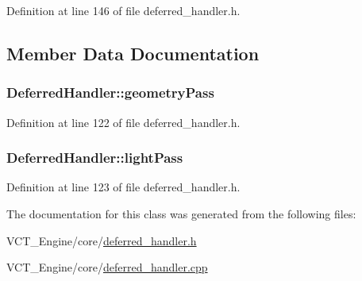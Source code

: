 Definition at line 146 of file deferred\+\_\+handler.\+h.



\subsection{Member Data Documentation}
\hypertarget{class_deferred_handler_ae4c429b5ccbb6c063cbf58e2339d386b}{}
\subsubsection[{geometry\+Pass}]{ Deferred\+Handler\+::geometry\+Pass}\label{class_deferred_handler_ae4c429b5ccbb6c063cbf58e2339d386b}


Definition at line 122 of file deferred\+\_\+handler.\+h.

\hypertarget{class_deferred_handler_a4138df076eeb76aa0720c7b9ca9e3b6f}{}
\subsubsection[{light\+Pass}]{ Deferred\+Handler\+::light\+Pass}\label{class_deferred_handler_a4138df076eeb76aa0720c7b9ca9e3b6f}


Definition at line 123 of file deferred\+\_\+handler.\+h.



The documentation for this class was generated from the following files\+:\begin{DoxyCompactItemize}
\item 
V\+C\+T\+\_\+\+Engine/core/\hyperlink{deferred__handler_8h}{deferred\+\_\+handler.\+h}\item 
V\+C\+T\+\_\+\+Engine/core/\hyperlink{deferred__handler_8cpp}{deferred\+\_\+handler.\+cpp}\end{DoxyCompactItemize}
